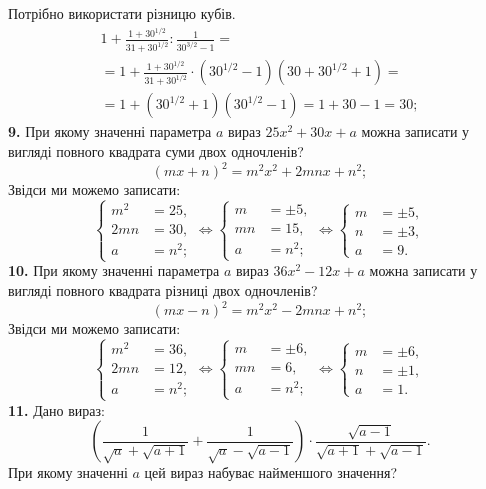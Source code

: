 Потрібно використати різницю кубів.
\begin{multline*}
1 + \frac{1 + 30^{1/2}}{31 + 30^{1/2}} : \frac{1}{30^{3/2} - 1} =\\
= 1 + \frac{1 + 30^{1/2}}{31 + 30^{1/2}} \cdot \left(30^{1/2} - 1\right)\left(30 + 30^{1/2} + 1\right) =\\
= 1 + \left(30^{1/2} + 1\right)\left(30^{1/2} - 1\right) = 1 + 30 - 1 = 30;
\end{multline*}
\textbf{9.} При якому значенні параметра $a$ вираз $25x^2 + 30x + a$ можна записати у вигляді повного квадрата суми двох одночленів?
$$
\left(mx + n\right)^2 = m^2x^2 + 2mnx + n^2;
$$
Звідси ми можемо записати:
$$
\left\{
\begin{aligned}
m^2 &= 25,\\
2mn &= 30,\\
a &= n^2;
\end{aligned}
\right.
\Leftrightarrow
\left\{
\begin{aligned}
m &= \pm 5,\\
mn &= 15,\\
a &= n^2;
\end{aligned}
\right.
\Leftrightarrow
\left\{
\begin{aligned}
m &= \pm 5,\\
n &= \pm 3,\\
a &= 9.
\end{aligned}
\right.
$$
\textbf{10.} При якому значенні параметра $a$ вираз $36x^2 - 12x + a$ можна записати у вигляді
повного квадрата різниці двох одночленів?
$$
\left(mx - n\right)^2 = m^2x^2 - 2mnx + n^2;
$$
Звідси ми можемо записати:
$$
\left\{
\begin{aligned}
m^2 &= 36,\\
2mn &= 12,\\
a &= n^2;
\end{aligned}
\right.
\Leftrightarrow
\left\{
\begin{aligned}
m &= \pm 6,\\
mn &= 6,\\
a &= n^2;
\end{aligned}
\right.
\Leftrightarrow
\left\{
\begin{aligned}
m &= \pm 6,\\
n &= \pm 1,\\
a &= 1.
\end{aligned}
\right.
$$
\textbf{11.} Дано вираз:
$$
\left(\frac{1}{\sqrt{a} + \sqrt{a + 1}} + \frac{1}{\sqrt{a} - \sqrt{a - 1}}\right) \cdot \frac{\sqrt{a - 1}}{\sqrt{a + 1} + \sqrt{a - 1}}.
$$
При якому значенні $a$ цей вираз набуває найменшого значення?

